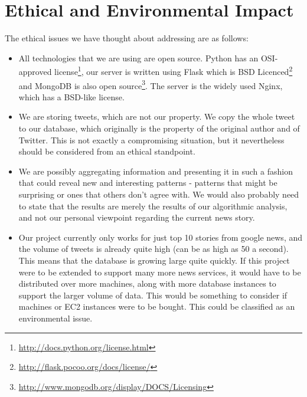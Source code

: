 \documentclass[a4paper,12pt]{article}
\begin{document}
	\section{Ethical and Environmental Impact}	
	
	The ethical issues we have thought about addressing are as follows:
	
	\begin{itemize}
	  
	  \item All technologies that we are using are open source. Python has an OSI-approved license\footnote{\url {http://docs.python.org/license.html}}, our server is written using Flask which is BSD Licenced\footnote{\url{http://flask.pocoo.org/docs/license/}} and MongoDB is also open source\footnote{\url{http://www.mongodb.org/display/DOCS/Licensing}}. The server is the widely used Nginx, which has a BSD-like license.
	  
		\item We are storing tweets, which are not our property. We copy the whole tweet to our database, which originally is the property of the original author and of Twitter. This is not exactly a compromising situation, but it nevertheless should be considered from an ethical standpoint.
		
		\item We are possibly aggregating information and presenting it in such a fashion that could reveal new and interesting patterns - patterns that might be surprising or ones that others don't agree with. We would also probably need to state that the results are merely the results of our algorithmic analysis, and not our personal viewpoint regarding the current news story.
		
		\item Our project currently only works for just top 10 stories from google news, and the volume of tweets is already quite high (can be as high as 50 a second). This means that the database is growing large quite quickly. If this project were to be extended to support many more news services, it would have to be distributed over more machines, along with more database instances to support the larger volume of data. This would be something to consider if machines or EC2 instances were to be bought. This could be classified as an environmental issue.
	  
  \end{itemize}
  
\end{document}
